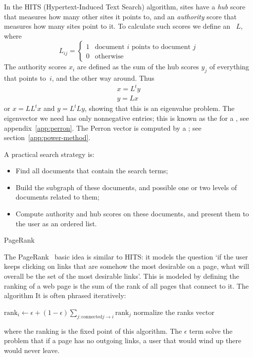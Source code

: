 In the HITS (Hypertext-Induced
Text Search) algorithm, sites have a \emph{hub} score that measures how many
other sites it points to, and an \emph{authority} score that measures
how many sites point to it. To calculate such scores we define an
~$L$, where
\[ L_{ij}=
\begin{cases}
  1&\mbox{document $i$ points to document $j$}\\
  0&\mbox{otherwise}
\end{cases}
\]
The authority scores $x_i$ are defined as the sum of the hub scores
$y_j$ of everything that points to~$i$, and the other way around. Thus
\[
\begin{array}{l}
  x=L^ty\\ y=Lx
\end{array}
\]
or $x=LL^tx$ and $y=L^tLy$, showing that this is an eigenvalue
problem. The eigenvector we need has only nonnegative entries; this is
known as the  for a
, see appendix~\ref{app:perron}. The
Perron vector is computed by a ; see
section~\ref{app:power-method}.

A practical search strategy is:
\begin{itemize}
\item Find all documents that contain the search terms;
\item Build the subgraph of these documents, and possible one or two
  levels of documents related to them;
\item Compute authority and hub scores on these documents, and present
  them to the user as an ordered list.
\end{itemize}


 {PageRank}

The PageRank~\cite{PageBrin:PageRank} basic idea is similar to
HITS:
it models the question
`if the user keeps clicking on links that are somehow the
most desirable on a page, what will overall be the set of the most
desirable links'. 
This is modeled by defining
the ranking of a web page is the sum of the rank of all pages
that connect to it. The algorithm It is often phrased iteratively:
%
\begin{displayalgorithm}
        { 
          {
            $\mathrm{rank}_i \leftarrow \epsilon +
            (1-\epsilon) \sum_{j\colon\mathrm{connected}j\rightarrow i}\mathrm{rank}_j$
          } \;
          normalize the ranks vector \;
        }
\end{displayalgorithm}
%
where the ranking is the fixed point of this algorithm.
The $\epsilon$ term solve the problem that if a page has
no outgoing links, a user that would wind up there would never
leave. 

